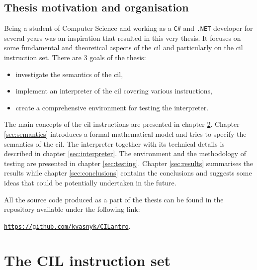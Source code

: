 \documentclass[declaration,shortabstract,english,mgr]{iithesis}
\begin{document}
\section{Thesis motivation and organisation}

Being a student of Computer Science and working as a \texttt{C\#} and \texttt{.NET} developer for several years was an inspiration that resulted in this very thesis. It focuses on some fundamental and theoretical aspects of the \acrshort{cil} and particularly on the \acrshort{cil} instruction set. There are 3 goals of the thesis:
\begin{itemize}
	\item{investigate the semantics of the \acrshort{cil},}
	\item{implement an interpreter of the \acrshort{cil} covering various instructions,}
	\item{create a comprehensive environment for testing the interpreter.}
\end{itemize}

The main concepts of the \acrshort{cil} instructions are presented in chapter \ref{sec:instructionSet}. Chapter \ref{sec:semantics} introduces a formal mathematical model and tries to specify the semantics of the \acrshort{cil}. The interpreter together with its technical details is described in chapter \ref{sec:interpreter}. The environment and the methodology of testing are presented in chapter \ref{sec:testing}. Chapter \ref{sec:results} summarises the results while chapter \ref{sec:conclusions} contains the conclusions and suggests some ideas that could be potentially undertaken in the future.

All the source code produced as a part of the thesis can be found in the repository available under the following link:
\begin{center}
	\href{https://github.com/kvasnyk/CILantro}{\texttt{https://github.com/kvasnyk/CILantro}}.
\end{center}

\clearpage


\chapter{The CIL instruction set}
\label{sec:instructionSet}
\end{document}
